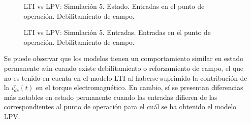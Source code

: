 \documentclass[a4paper, 10pt, onecolumn,journal]{ieeeconf}
\begin{document}
\begin{figure}[H]
	\centering
	\begin{adjustbox}{max width=\columnwidth}
	\end{adjustbox}
	\caption{LTI vs LPV: Simulación 5. Estado. Entradas en el punto de operación. Debilitamiento de campo.}
	\label{simulación 5 estado}
\end{figure}

\begin{figure}[H]
	\centering
	\begin{adjustbox}{scale=0.7,max width=\columnwidth}
	\end{adjustbox}
	\caption{LTI vs LPV: Simulación 5. Entradas. Entradas en el punto de operación. Debilitamiento de campo.}
	\label{simulación 5 entradas}
\end{figure}

Se puede observar que los modelos tienen un comportamiento
similar en estado permanente aún cuando existe debilitamiento o reforzamiento de campo, el que no es tenido en cuenta
en el modelo LTI al haberse suprimido la contribución de la $i^r_{ds}(t)$ en el torque electromagnético.
En cambio, sí se presentan diferencias más notables en estado permanente cuando las entradas difieren de las correspondientes al 
punto de operación para el cuál se ha obtenido el modelo LPV.
\end{document}
